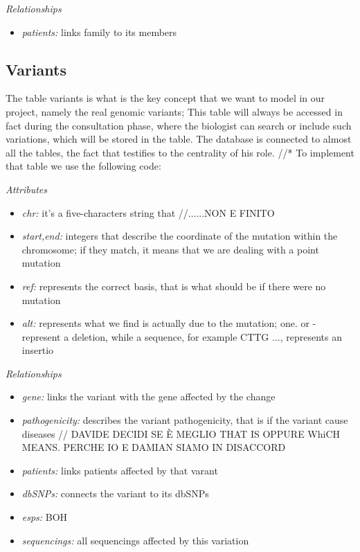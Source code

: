 \emph{Relationships}   
\begin{itemize}
  \item \emph{patients:} links family to its members
\end{itemize}

\subsection{Variants}
The table variants is what is the key concept that we want to model in our project, namely the real genomic variants; This table will always be accessed in fact during the consultation phase, where the biologist can search or include such variations, which will be stored in the table. The database is connected to almost all the tables, the fact that testifies to the centrality of his role. //*
To implement that table we use the following code:


 
\emph{Attributes}   
\begin{itemize}
  \item \emph{chr:} it's a five-characters string that //......NON E FINITO
  \item \emph{start,end:} integers that describe the coordinate of the mutation within the chromosome; if they match, it means that we are dealing with a point mutation
   \item \emph{ref:} represents the correct basis, that is what should be  if there were no mutation
   \item \emph{alt:} represents what we find is actually due to the mutation; one. or - represent a deletion, while a sequence, for example CTTG ..., represents an insertio
\end{itemize}

\emph{Relationships}   
\begin{itemize}
  \item \emph{gene:} links the variant with the gene affected by the change
  \item \emph{pathogenicity:} describes the variant pathogenicity, that is if the variant cause diseases
  // DAVIDE DECIDI SE È MEGLIO THAT IS OPPURE WhiCH MEANS. PERCHE IO E DAMIAN SIAMO IN DISACCORD
  \item \emph{patients:} links patients affected by that varant
  \item \emph{dbSNPs:} connects the variant to its dbSNPs
  \item \emph{esps:} BOH
  \item \emph{sequencings:} all sequencings affected by this variation
\end{itemize}
 




